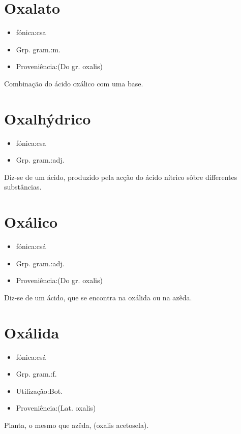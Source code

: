 \section{Oxalato}
\begin{itemize}
\item {fónica:csa}
\end{itemize}
\begin{itemize}
\item {Grp. gram.:m.}
\end{itemize}
\begin{itemize}
\item {Proveniência:(Do gr. \textunderscore oxalis\textunderscore )}
\end{itemize}
Combinação do ácido oxálico com uma base.
\section{Oxalhýdrico}
\begin{itemize}
\item {fónica:csa}
\end{itemize}
\begin{itemize}
\item {Grp. gram.:adj.}
\end{itemize}
Diz-se de um ácido, produzido pela acção do ácido nítrico sôbre differentes substâncias.
\section{Oxálico}
\begin{itemize}
\item {fónica:csá}
\end{itemize}
\begin{itemize}
\item {Grp. gram.:adj.}
\end{itemize}
\begin{itemize}
\item {Proveniência:(Do gr. \textunderscore oxalis\textunderscore )}
\end{itemize}
Diz-se de um ácido, que se encontra na oxálida ou na azêda.
\section{Oxálida}
\begin{itemize}
\item {fónica:csá}
\end{itemize}
\begin{itemize}
\item {Grp. gram.:f.}
\end{itemize}
\begin{itemize}
\item {Utilização:Bot.}
\end{itemize}
\begin{itemize}
\item {Proveniência:(Lat. \textunderscore oxalis\textunderscore )}
\end{itemize}
Planta, o mesmo que \textunderscore azêda\textunderscore , (\textunderscore oxalis acetosela\textunderscore ).
